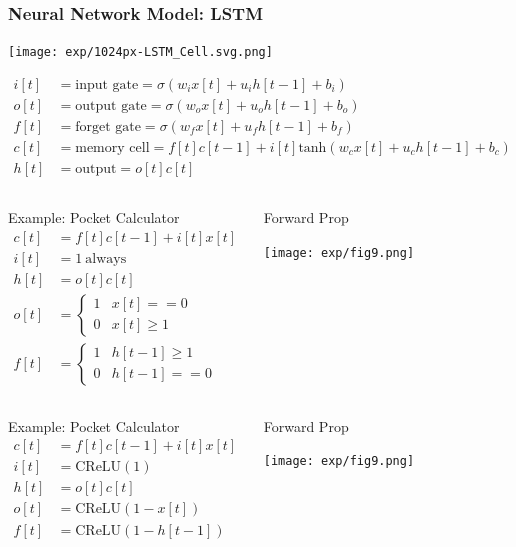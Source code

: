 \documentclass{beamer}
\begin{document}
\begin{frame}
  \frametitle{Neural Network Model: LSTM}
  \centerline{\texttt{[image: exp/1024px-LSTM\_Cell.svg.png]}}
  \begin{align*}
    i[t] &=\mbox{input gate}=\sigma(w_i x[t]+u_i h[t-1]+b_i)\\
    o[t] &=\mbox{output gate}=\sigma(w_o x[t]+u_o h[t-1]+b_o)\\
    f[t] &=\mbox{forget gate}=\sigma(w_f x[t]+u_f h[t-1]+b_f)\\
    c[t] &=\mbox{memory cell}=f[t]c[t-1]+i[t]\mbox{tanh}\left(w_cx[t]+u_ch[t-1]+b_c\right)\\
    h[t] &=\mbox{output}=o[t]c[t]
  \end{align*}
\end{frame}

\begin{frame}
  \begin{columns}
    \column{2in}
    \begin{block}{Example: Pocket Calculator}
      \begin{align*}
        c[t] &=f[t]c[t-1]+i[t]x[t]\\
        i[t] &=1~\mbox{always}\\
        h[t] &=o[t]c[t]\\
        o[t] &=\begin{cases}1 & x[t]==0\\0&x[t]\ge 1\end{cases}\\
        f[t] &=\begin{cases}1 & h[t-1]\ge 1\\0&h[t-1]==0\end{cases}
      \end{align*}
    \end{block}
    \column{2.25in}
    \begin{block}{Forward Prop}
      \centerline{\texttt{[image: exp/fig9.png]}}
    \end{block}
    \end{columns}
\end{frame}

\begin{frame}
  \begin{columns}
    \column{2in}
    \begin{block}{Example: Pocket Calculator}
      \begin{align*}
        c[t] &=f[t]c[t-1]+i[t]x[t]\\
        i[t] &=\mbox{CReLU}(1)\\
        h[t] &=o[t]c[t]\\
        o[t] &=\mbox{CReLU}(1-x[t])\\
        f[t] &=\mbox{CReLU}(1-h[t-1])
      \end{align*}
    \end{block}
    \column{2.25in}
    \begin{block}{Forward Prop}
      \centerline{\texttt{[image: exp/fig9.png]}}
    \end{block}
    \end{columns}
\end{frame}
\end{document}
